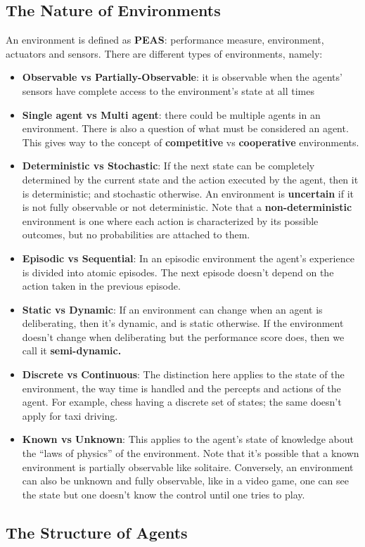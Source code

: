 \documentclass[twoside]{article}
\begin{document}
\subsection{The Nature of Environments}
An environment is defined as \textbf{PEAS}: performance measure, environment,
actuators and sensors. There are different types of environments, namely:
\begin{itemize}
\item \textbf{Observable vs Partially-Observable}: it is observable when the agents'
        sensors have complete access to the environment's state at all times
\item \textbf{Single agent vs Multi agent}: there could be multiple agents in
        an environment. There is also a question of what must be considered an
        agent. This gives way to the concept of \textbf{competitive} vs
        \textbf{cooperative} environments.
\item \textbf{Deterministic vs Stochastic}: If the next state can be completely
        determined by the current state and the action executed by the agent,
        then it is deterministic; and stochastic otherwise. An environment
        is \textbf{uncertain} if it is not fully observable or not deterministic.
        Note that a \textbf{non-deterministic} environment is one where each
        action is characterized by its possible outcomes, but no probabilities
        are attached to them.
\item \textbf{Episodic vs Sequential}: In an episodic environment the agent's
        experience is divided into atomic episodes. The next episode doesn't
        depend on the action taken in the previous episode.
\item \textbf{Static vs Dynamic}: If an environment can change when an agent
        is deliberating, then it's dynamic, and is static otherwise. If the
        environment doesn't change when deliberating but the performance score
        does, then we call it \textbf{semi-dynamic.}
\item \textbf{Discrete vs Continuous}: The distinction here applies to the state
        of the environment, the way time is handled and the percepts and actions
        of the agent. For example, chess having a discrete set of states; the
        same doesn't apply for taxi driving.
\item \textbf{Known vs Unknown}: This applies to the agent's state of knowledge
        about the ``laws of physics'' of the environment. Note that it's 
        possible that a known environment is partially observable like solitaire.
        Conversely, an environment can also be unknown and fully observable,
        like in a video game, one can see the state but one doesn't know the
        control until one tries to play.
\end{itemize}
\subsection{The Structure of Agents}
\end{document}
